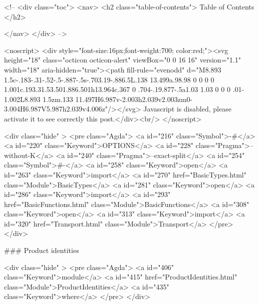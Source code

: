   <!-- 
  <div class="toc">
    <nav>
    <h2 class="table-of-contents"> Table of Contents </h2>
      

    </nav>
  </div>
   -->

  <noscript>
  <div style="font-size:16px;font-weight:700; color:red;"><svg height="18" class="octicon octicon-alert" viewBox="0 0 16 16" version="1.1" width="18" aria-hidden="true"><path fill-rule="evenodd" d="M8.893 1.5c-.183-.31-.52-.5-.887-.5s-.703.19-.886.5L.138 13.499a.98.98 0 0 0 0 1.001c.193.31.53.501.886.501h13.964c.367 0 .704-.19.877-.5a1.03 1.03 0 0 0 .01-1.002L8.893 1.5zm.133 11.497H6.987v-2.003h2.039v2.003zm0-3.004H6.987V5.987h2.039v4.006z"/></svg> Javascript is disabled, please activate it to see correctly this post.</div><br/>
  </noscript>

  <div class="hide" >
<pre class="Agda">
<a id="216" class="Symbol">{-#</a> <a id="220" class="Keyword">OPTIONS</a> <a id="228" class="Pragma">--without-K</a> <a id="240" class="Pragma">--exact-split</a> <a id="254" class="Symbol">#-}</a>
<a id="258" class="Keyword">open</a> <a id="263" class="Keyword">import</a> <a id="270" href="BasicTypes.html" class="Module">BasicTypes</a>
<a id="281" class="Keyword">open</a> <a id="286" class="Keyword">import</a> <a id="293" href="BasicFunctions.html" class="Module">BasicFunctions</a>
<a id="308" class="Keyword">open</a> <a id="313" class="Keyword">import</a> <a id="320" href="Transport.html" class="Module">Transport</a>
</pre>
</div>

### Product identities

<div class="hide" >
<pre class="Agda">
<a id="406" class="Keyword">module</a>
  <a id="415" href="ProductIdentities.html" class="Module">ProductIdentities</a>
  <a id="435" class="Keyword">where</a>
</pre>
</div>


